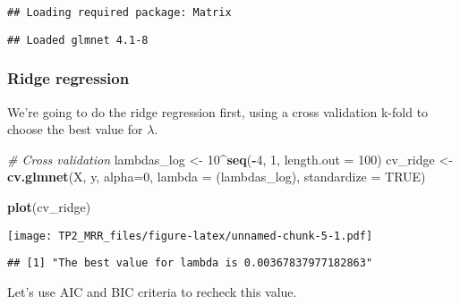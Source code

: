 \documentclass[
]{article}
\newenvironment{Shaded}{\begin{snugshade}}{\end{snugshade}}
\newcommand{\AttributeTok}[1]{\textcolor[rgb]{0.13,0.29,0.53}{#1}}
\newcommand{\CommentTok}[1]{\textcolor[rgb]{0.56,0.35,0.01}{\textit{#1}}}
\newcommand{\ConstantTok}[1]{\textcolor[rgb]{0.56,0.35,0.01}{#1}}
\newcommand{\DecValTok}[1]{\textcolor[rgb]{0.00,0.00,0.81}{#1}}
\newcommand{\FunctionTok}[1]{\textcolor[rgb]{0.13,0.29,0.53}{\textbf{#1}}}
\newcommand{\NormalTok}[1]{#1}
\newcommand{\OtherTok}[1]{\textcolor[rgb]{0.56,0.35,0.01}{#1}}
\newcommand{\SpecialCharTok}[1]{\textcolor[rgb]{0.81,0.36,0.00}{\textbf{#1}}}
\newcommand{\StringTok}[1]{\textcolor[rgb]{0.31,0.60,0.02}{#1}}
\begin{document}
\begin{verbatim}
## Loading required package: Matrix
\end{verbatim}

\begin{verbatim}
## Loaded glmnet 4.1-8
\end{verbatim}

\subsubsection{Ridge regression}\label{ridge-regression}

We're going to do the ridge regression first, using a cross validation
k-fold to choose the best value for \(\lambda\).

\begin{Shaded}
\begin{Highlighting}[]
\CommentTok{\# Cross validation}
\NormalTok{lambdas\_log }\OtherTok{\textless{}{-}} \DecValTok{10}\SpecialCharTok{\^{}}\FunctionTok{seq}\NormalTok{(}\SpecialCharTok{{-}}\DecValTok{4}\NormalTok{, }\DecValTok{1}\NormalTok{, }\AttributeTok{length.out =} \DecValTok{100}\NormalTok{)}
\NormalTok{cv\_ridge }\OtherTok{\textless{}{-}} \FunctionTok{cv.glmnet}\NormalTok{(X, y, }\AttributeTok{alpha=}\DecValTok{0}\NormalTok{, }\AttributeTok{lambda =}\NormalTok{ (lambdas\_log), }\AttributeTok{standardize =} \ConstantTok{TRUE}\NormalTok{)}

\FunctionTok{plot}\NormalTok{(cv\_ridge)}
\end{Highlighting}
\end{Shaded}

\texttt{[image: TP2\_MRR\_files/figure-latex/unnamed-chunk-5-1.pdf]}

\begin{Shaded}
\end{Shaded}

\begin{verbatim}
## [1] "The best value for lambda is 0.00367837977182863"
\end{verbatim}

Let's use AIC and BIC criteria to recheck this value.
\end{document}
